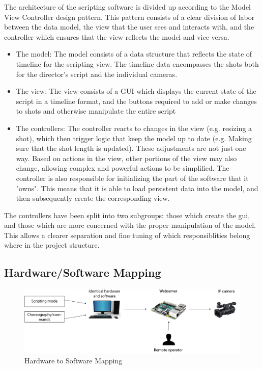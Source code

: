 \documentclass[11pt,twoside,a4paper]{article}
\begin{document}
The architecture of the scripting software is divided up according to the Model View Controller design pattern. This pattern consists of a clear division of labor between the data model, the view that the user sees and interacts with, and the controller which ensures that the view reflects the model and vice versa.
\begin{itemize}
    \item The model: The model consists of a data structure that reflects the state of timeline for the scripting view. The timeline data encompasses the shots both for the director's script and the individual cameras.
    \item The view: The view consists of a GUI which displays the current state of the script in a timeline format, and the buttons required to add or make changes to shots and otherwise manipulate the entire script
    \item The controllers: The controller reacts to changes in the view (e.g. resizing a shot), which then trigger logic that keep the model up to date (e.g. Making sure that the shot length is updated). These adjustments are not just one way. Based on actions in the view, other portions of the view may also change, allowing complex and powerful actions to be simplified. The controller is also responsible for initializing the part of the software that it "owns". This means that it is able to load persistent data into the model, and then subsequently create the corresponding view.
\end{itemize}
The controllers have been split into two subgroups: those which create the gui, and those which are more concerned with the proper manipulation of the model. This allows a clearer separation and fine tuning of which responsiblities belong where in the project structure.

\subsection{Hardware/Software Mapping}
\begin{figure}[H]
	\centering
	\includegraphics[width=\textwidth]{HWsoftwaremapping}
	\caption{Hardware to Software Mapping}
	\label{fig:mapping}
\end{figure}
\end{document}
